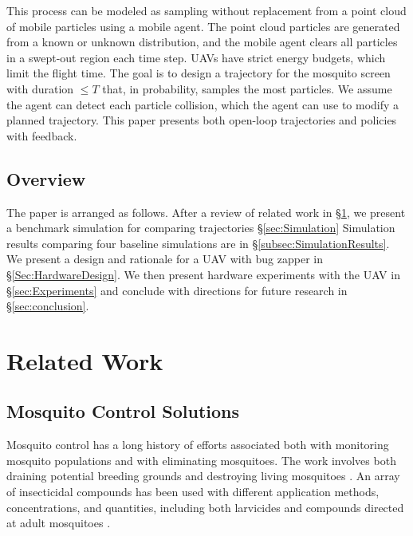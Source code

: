 \documentclass[letterpaper, 10 pt, conference]{ieeeconf}  %
\begin{document}
    This process can be modeled as sampling without replacement from a point cloud of mobile particles using a mobile agent.  The point cloud particles are generated from a known or unknown distribution, and the mobile agent clears all particles in a swept-out region each time step. 
    UAVs have strict energy budgets, which limit the flight time.
    The goal is to design a trajectory for the mosquito screen with duration $\le T$ that, in probability, samples the most particles.  
   We assume the agent can detect each particle collision, which the agent can use to modify a planned trajectory.
    This paper presents both open-loop trajectories and policies with feedback. 
  
      \subsection{Overview}

  The paper is arranged as follows.  
  After a review of related work in \S \ref{sec:relatedWork},
    we present a benchmark simulation for comparing trajectories \S \ref{sec:Simulation}
     Simulation results comparing four baseline simulations are in \S \ref{subsec:SimulationResults}.
  We present a design and rationale for a UAV with bug zapper in \S  \ref{Sec:HardwareDesign}.
  We then present hardware experiments with the UAV  in \S  \ref{sec:Experiments} and conclude with directions for future research  in \S  \ref{sec:conclusion}.
  
  
 

  \section{Related Work}\label{sec:relatedWork}
  
  \subsection{Mosquito Control Solutions}
  
	Mosquito control has a long history of efforts associated both with monitoring mosquito populations \cite{dennett2007associations} and with eliminating mosquitoes.  The work involves both draining potential breeding grounds and destroying living mosquitoes \cite{peter2005tick}.  An array of insecticidal compounds has been used with different application methods, concentrations, and quantities, including both larvicides and compounds directed at adult mosquitoes \cite{larvicides2005guidelines}.
	
\end{document}
